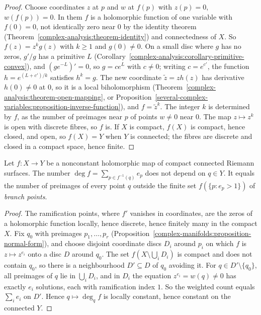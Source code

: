 \begin{proof}
Choose coordinates $z$ at $p$ and $w$ at $f(p)$ with $z(p) = 0$, $w(f(p)) = 0$. In them $f$ is a holomorphic function of one variable with $f(0) = 0$, not identically zero near $0$ by the identity theorem
(Theorem~\ref{complex-analysis:theorem-identity}) and connectedness of $X$. So $f(z) = z^kg(z)$ with $k \geq 1$ and $g(0) \neq 0$. On a small disc where $g$ has no zeros, $g'/g$ has a primitive $L$
(Corollary~\ref{complex-analysis:corollary-primitive-convex}), and $(ge^{-L})' = 0$, so $g = ce^L$ with $c \neq 0$; writing $c = e^{c'}$, the function $h = e^{(L + c')/k}$ satisfies $h^k = g$. The new coordinate
$\tilde z = zh(z)$ has derivative $h(0) \neq 0$ at $0$, so it is a local biholomorphism (Theorem~\ref{complex-analysis:theorem-open-mapping}, or
Proposition~\ref{several-complex-variables:proposition-inverse-function}), and $f = \tilde z^k$. The integer $k$ is determined by $f$, as the number of preimages near $p$ of points $w \neq 0$ near $0$. The map
$z \mapsto z^k$ is open with discrete fibres, so $f$ is. If $X$ is compact, $f(X)$ is compact, hence closed, and open, so $f(X) = Y$ when $Y$ is connected; the fibres are discrete and closed in a compact space, hence
finite.
\end{proof}

\begin{proposition}\label{complex-manifolds:proposition-degree}
Let $f \colon X \to Y$ be a nonconstant holomorphic map of compact connected Riemann surfaces. The number $\deg f = \sum_{p \in f^{-1}(q)}e_p$ does not depend on $q \in Y$. It equals the number of preimages of every
point $q$ outside the finite set $f(\{p : e_p > 1\})$ of \emph{branch points}.
\end{proposition}

\begin{proof}
The ramification points, where $f'$ vanishes in coordinates, are the zeros of a holomorphic function locally, hence discrete, hence finitely many in the compact $X$. Fix $q_0$ with preimages $p_1, \ldots, p_r$
(Proposition~\ref{complex-manifolds:proposition-normal-form}), and choose disjoint coordinate discs $D_i$ around $p_i$ on which $f$ is $z \mapsto z^{e_i}$ onto a disc $D$ around $q_0$. The set
$f(X \setminus \bigcup_iD_i)$ is compact and does not contain $q_0$, so there is a neighbourhood $D' \subseteq D$ of $q_0$ avoiding it. For $q \in D' \setminus \{q_0\}$, all preimages of $q$ lie in $\bigcup_iD_i$,
and in $D_i$ the equation $z^{e_i} = w(q) \neq 0$ has exactly $e_i$ solutions, each with ramification index $1$. So the weighted count equals $\sum_ie_i$ on $D'$. Hence $q \mapsto \deg_q f$ is locally constant, hence
constant on the connected $Y$.
\end{proof}

